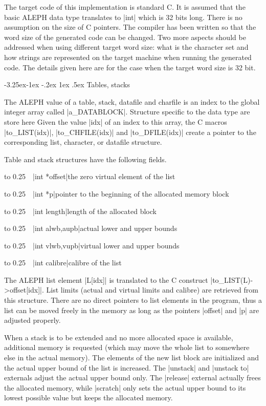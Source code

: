 \documentclass{article}
\makeatletter
\newcommand\A{\textsf{ALEPH}}
\newcommand\g[1]{\textsf{#1}}
\renewcommand\subsection{%
\@startsection{subsection}{2}{\z@}%
   {-3.25ex\@plus -1ex \@minus -.2ex}%
   {1ex \@plus .5ex}%
   {\normalfont\normalsize\bfseries}}
\makeatother
\begin{document}
The target code of this implementation is standard {\sf C}. It is assumed
that the basic \A{} data type translates to \pp|int| which is 32 bits long.
There is no assumption on the size of {\sf C} pointers. The compiler has
been written so that the word size of the generated code can be changed. Two
more aspects should be addressed when using different target word size: what
is the character set and how strings are represented on the target machine
when running the generated code. The details given here are for the case
when the target word size is 32 bit.

\subsection{Tables, stacks}\label{subsec:tables-stacks}

The \A{} value of a \g{table}, \g{stack}, \g{datafile} and \g{charfile} is
an index to the global integer array called \pp|a\_DATABLOCK|. Structure 
specific to the data type are store here Given the value \pp|idx| of an
index to this array, the {\sf C} macros
\pp|to\_LIST(idx)|, \pp|to\_CHFILE(idx)| and \pp|to\_DFILE(idx)| create a
pointer to the corresponding list, character, or datafile structure.

Table and stack structures have the following fields.
\def\HH{\noindent\hbox to 0.25\linewidth\bgroup~~}

\medskip

\HH\pp|int *offset|\HE the zero virtual element of the list

\HH\pp|int *p|\HE  pointer to the beginning of the allocated memory block

\HH\pp|int length|\HE length of the allocated block

\HH\pp|int alwb,aupb|\HE actual lower and upper bounds

\HH\pp|int vlwb,vupb|\HE virtual lower and upper bounds

\HH\pp|int calibre|\HE  calibre of the list

\smallskip
\noindent
The \A{} list element \pp|L[idx]| is translated to the {\sf C} construct
\pp|to\_LIST(L)->\allowbreak offset[idx]|.
List limits (actual and virtual limits and calibre) are
retrieved from this structure. There are no direct pointers to list elements
in the program, thus a list can be moved freely in the memory as long
as the pointers \pp|offset| and \pp|p| are adjusted properly.

When a stack is to be extended and no more allocated space is available,
additional memory is requested (which may move the whole list to somewhere
else in the actual memory). The elements of the new list block are initialized
and the actual upper bound of the list is increased. The \pp|unstack| and
\pp|unstack to| externals adjust the actual upper bound only. The
\pp|release| external actually frees the allocated memory, while
\pp|scratch| only sets the actual upper bound to its lowest possible value
but keeps the allocated memory.
\end{document}
